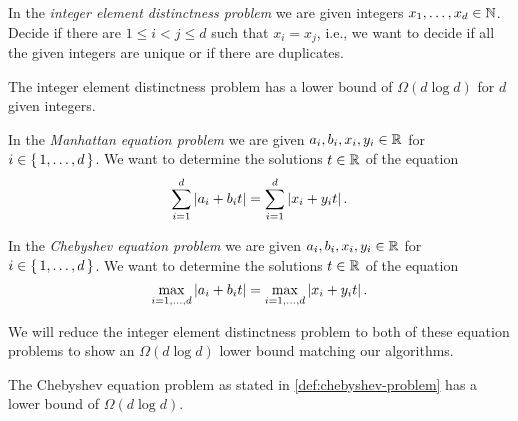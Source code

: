 \begin{definition}
  In the \emph{integer element distinctness problem} we are given integers \(x_1, \dots, x_d \in \mathbb{N}\). Decide if there are \(1 \leq i < j \leq d\) such that \(x_i = x_j\), i.e., we want to decide if all the given integers are unique or if there are duplicates.
\end{definition}

\begin{theorem}
	The integer element distinctness problem has a lower bound of \(\Omega(d \log d)\) for \(d\) given integers. 
\end{theorem}

\begin{definition}\label{def:manhattan-problem}
	In the \emph{Manhattan equation problem} we are given \(a_i, b_i, x_i, y_i \in \mathbb{R}\) for \(i \in \set{1, \dots, d}\). We want to determine the solutions \(t \in \mathbb{R}\) of the equation 
	\begin{equation}
		\sum_{i=1}^d \left|a_i + b_i t\right| = \sum_{i=1}^d \left|x_i + y_i t\right|.
	\end{equation}
\end{definition}

\begin{definition}\label{def:chebyshev-problem}
	In the \emph{Chebyshev equation problem} we are given \(a_i, b_i, x_i, y_i \in \mathbb{R}\) for \(i \in \set{1, \dots, d}\). We want to determine the solutions \(t \in \mathbb{R}\) of the equation 
	\begin{equation}
		\max_{i=1, \dots, d} \left|a_i + b_i t\right| = \max_{i=1,\dots, d} \left|x_i + y_i t\right|.
	\end{equation}
\end{definition}

We will reduce the integer element distinctness problem to both of these equation problems to show an \(\Omega(d \log d)\) lower bound matching our algorithms. 

\begin{lemma}
	The Chebyshev equation problem as stated in \cref{def:chebyshev-problem} has a lower bound of \(\Omega(d \log d)\).
\end{lemma}

